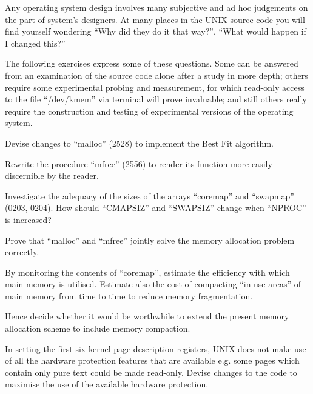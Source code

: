 %
%

Any operating system design involves
many subjective and ad hoc judgements
on the part of system's designers. At
many places in the UNIX source code
you will find yourself wondering ``Why
did they do it that way?'', ``What would
happen if I changed this?''

The following exercises express some of
these questions. Some can be answered
from an examination of the source code
alone after a study in more depth; others require some experimental probing
and measurement, for which read-only
access to the file ``/dev/kmem'' via terminal will prove invaluable; and still
others really require the construction
and testing of experimental versions of
the operating system.


\bd
\item[1.1] Devise changes to ``malloc'' (2528)
to implement the Best Fit algorithm.

\item[1.2] Rewrite the procedure ``mfree''
(2556) to render its function more
easily discernible by the reader.

\item[1.3] Investigate the adequacy of the
sizes of the arrays ``coremap'' and
``swapmap'' (0203, 0204).   How should
``CMAPSIZ'' and ``SWAPSIZ'' change when
``NPROC'' is increased?

\item[1.4] Prove that ``malloc'' and ``mfree''
jointly solve the memory allocation
problem correctly.

\item[1.5] By monitoring the contents of
``coremap'', estimate the efficiency with
which main memory is utilised. Estimate also the cost of compacting ``in
use areas'' of main memory from time to
time to reduce memory fragmentation.

Hence decide whether it would be
worthwhile to extend the present memory
allocation scheme to include memory
compaction.

\item[1.6] In setting the first six kernel
page description registers, UNIX does
not make use of all the hardware protection features that are available
e.g. some pages which contain only pure
text could be made read-only. Devise
changes to the code to maximise the use
of the available hardware protection.

